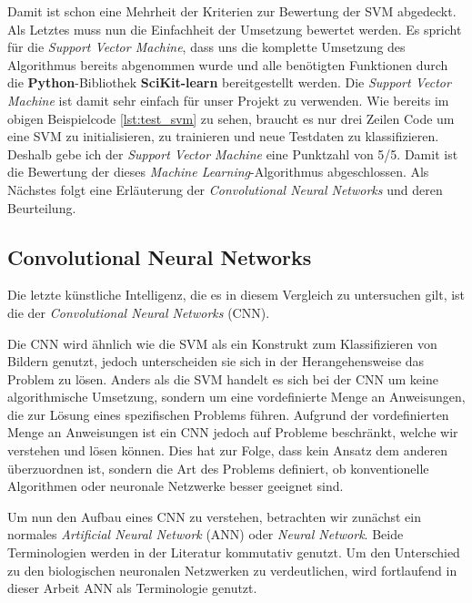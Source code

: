 Damit ist schon eine Mehrheit der Kriterien zur Bewertung der SVM abgedeckt. Als Letztes muss nun die Einfachheit der Umsetzung bewertet werden.
Es spricht für die \textit{Support Vector Machine}, dass uns die komplette Umsetzung des Algorithmus bereits abgenommen wurde und alle benötigten
Funktionen durch die \textbf{Python}-Bibliothek \textbf{SciKit-learn} bereitgestellt werden. Die \textit{Support Vector Machine} ist damit sehr einfach
für unser Projekt zu verwenden.  Wie bereits im obigen Beispielcode \ref{lst:test_svm} zu sehen, braucht es nur drei Zeilen Code um eine SVM zu initialisieren,
zu trainieren und neue Testdaten zu klassifizieren. Deshalb gebe ich der \textit{Support Vector Machine} eine Punktzahl von 5/5.
Damit ist die Bewertung der dieses \textit{Machine Learning}-Algorithmus abgeschlossen. 
Als Nächstes folgt eine Erläuterung der \textit{Convolutional Neural Networks} und deren Beurteilung.

\newpage

\subsection{Convolutional Neural Networks}
Die letzte künstliche Intelligenz, die es in diesem Vergleich zu untersuchen gilt, ist die der \textit{Convolutional Neural Networks} (CNN).

Die CNN wird ähnlich wie die SVM als ein Konstrukt zum Klassifizieren von Bildern genutzt, jedoch unterscheiden sie sich in der Herangehensweise das Problem zu lösen. Anders als die SVM handelt es sich bei der CNN um keine algorithmische Umsetzung, sondern um eine vordefinierte Menge an Anweisungen, die zur Lösung eines spezifischen Problems führen. Aufgrund der vordefinierten Menge an Anweisungen ist ein CNN jedoch auf Probleme beschränkt, welche wir verstehen und lösen können. Dies hat zur Folge, dass kein Ansatz dem anderen überzuordnen ist, sondern die Art des Problems definiert, ob konventionelle Algorithmen oder neuronale Netzwerke besser geeignet sind. \cite*{10.1007/978-3-319-45378-1_1}

Um nun den Aufbau eines CNN zu verstehen, betrachten wir zunächst ein normales \textit{Artificial Neural Network} (ANN) oder \textit{Neural Network}. Beide Terminologien werden in der Literatur kommutativ genutzt. Um den Unterschied zu den biologischen neuronalen Netzwerken zu verdeutlichen, wird fortlaufend in dieser Arbeit ANN als Terminologie genutzt.

